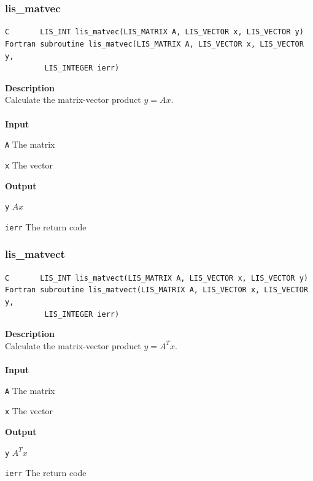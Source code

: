 \documentclass[a4paper]{article}
\newcommand{\namelistlabel}[1]{\mbox{#1}\hfill}
\newenvironment{namelist}[1]{%
\begin{list}{}
  {\let\makelabel\namelistlabel
  \settowidth{\labelwidth}{#1}
  \setlength{\leftmargin}{1.1\labelwidth}}
  }{%
\end{list}}
\begin{document}
\newpage
\subsubsection{lis\_matvec}
\begin{screen}
\verb|C       LIS_INT lis_matvec(LIS_MATRIX A, LIS_VECTOR x, LIS_VECTOR y)|\\
\verb|Fortran subroutine lis_matvec(LIS_MATRIX A, LIS_VECTOR x, LIS_VECTOR y,|\\
\verb|         LIS_INTEGER ierr)|
\end{screen}
{\bf Description}\\
\indent
Calculate the matrix-vector product $y=Ax$.
\\ \\
\noindent
{\bf Input}
\begin{namelist}{XXXXXXXXXXXXXXXXXXXX}
\item[\tt A] The matrix
\item[\tt x] The vector
\end{namelist}
{\bf Output}
\begin{namelist}{XXXXXXXXXXXXXXXXXXXX}
\item[\tt y] $Ax$
\item[\tt ierr] The return code
\end{namelist}

\subsubsection{lis\_matvect}
\begin{screen}
\verb|C       LIS_INT lis_matvect(LIS_MATRIX A, LIS_VECTOR x, LIS_VECTOR y)|\\
\verb|Fortran subroutine lis_matvect(LIS_MATRIX A, LIS_VECTOR x, LIS_VECTOR y,|\\
\verb|         LIS_INTEGER ierr)|
\end{screen}
{\bf Description}\\
\indent
Calculate the matrix-vector product $y=A^{T}x$.
\\ \\
\noindent
{\bf Input}
\begin{namelist}{XXXXXXXXXXXXXXXXXXXX}
\item[\tt A] The matrix
\item[\tt x] The vector
\end{namelist}
{\bf Output}
\begin{namelist}{XXXXXXXXXXXXXXXXXXXX}
\item[\tt y] $A^{T}x$
\item[\tt ierr] The return code
\end{namelist}
\end{document}
